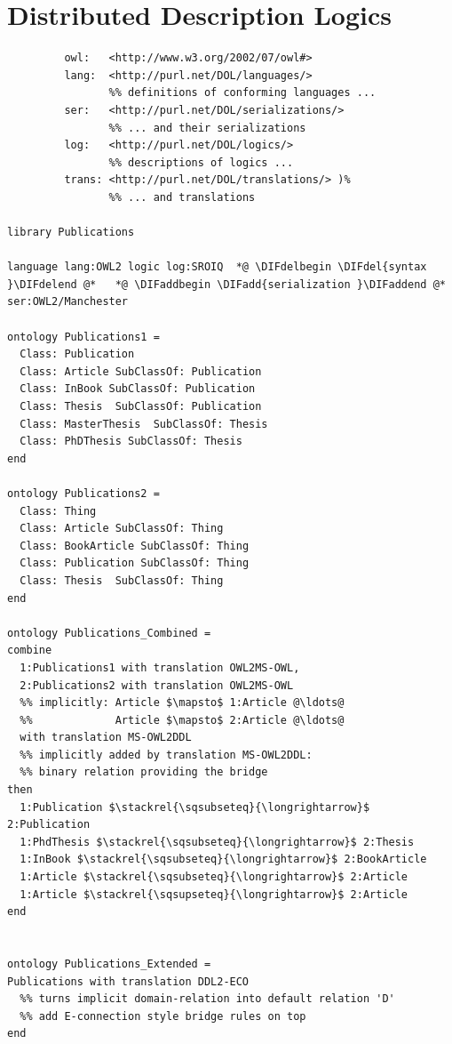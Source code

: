 \documentclass[10pt,fleqn,final]{scrreprt}
\newcommand{\sclause}[1]{\section{#1}}
\providecommand{\DIFadd}[1]{{\protect\color{blue}\uwave{#1}}} %
\providecommand{\DIFdel}[1]{{\protect\color{red}\sout{#1}}}                      %
\providecommand{\DIFaddbegin}{} %
\providecommand{\DIFaddend}{} %
\providecommand{\DIFdelbegin}{} %
\providecommand{\DIFdelend}{} %
\begin{document}
\sclause{Distributed Description Logics}\DIFaddbegin \label{ex:DDL}
\DIFaddend 

\begin{lstlisting}[basicstyle=\ttfamily,language=dolText,alsolanguage=OWL2manchester,escapechar=@,mathescape]
%prefix( :      <http://www.example.org/mereology#>
         owl:   <http://www.w3.org/2002/07/owl#>
         lang:  <http://purl.net/DOL/languages/>
                %% definitions of conforming languages ...
         ser:   <http://purl.net/DOL/serializations/>
                %% ... and their serializations
         log:   <http://purl.net/DOL/logics/>
                %% descriptions of logics ...
         trans: <http://purl.net/DOL/translations/> )%
                %% ... and translations

library Publications

language lang:OWL2 logic log:SROIQ  *@ \DIFdelbegin \DIFdel{syntax }\DIFdelend @*   *@ \DIFaddbegin \DIFadd{serialization }\DIFaddend @*  ser:OWL2/Manchester

ontology Publications1 =
  Class: Publication
  Class: Article SubClassOf: Publication
  Class: InBook SubClassOf: Publication
  Class: Thesis  SubClassOf: Publication
  Class: MasterThesis  SubClassOf: Thesis
  Class: PhDThesis SubClassOf: Thesis
end

ontology Publications2 =
  Class: Thing
  Class: Article SubClassOf: Thing
  Class: BookArticle SubClassOf: Thing
  Class: Publication SubClassOf: Thing
  Class: Thesis  SubClassOf: Thing
end

ontology Publications_Combined =
combine
  1:Publications1 with translation OWL2MS-OWL,
  2:Publications2 with translation OWL2MS-OWL
  %% implicitly: Article $\mapsto$ 1:Article @\ldots@
  %%             Article $\mapsto$ 2:Article @\ldots@  
  with translation MS-OWL2DDL
  %% implicitly added by translation MS-OWL2DDL: 
  %% binary relation providing the bridge
then
  1:Publication $\stackrel{\sqsubseteq}{\longrightarrow}$ 2:Publication
  1:PhdThesis $\stackrel{\sqsubseteq}{\longrightarrow}$ 2:Thesis
  1:InBook $\stackrel{\sqsubseteq}{\longrightarrow}$ 2:BookArticle
  1:Article $\stackrel{\sqsubseteq}{\longrightarrow}$ 2:Article
  1:Article $\stackrel{\sqsupseteq}{\longrightarrow}$ 2:Article
end


ontology Publications_Extended =
Publications with translation DDL2-ECO
  %% turns implicit domain-relation into default relation 'D'
  %% add E-connection style bridge rules on top
end


\end{lstlisting}
\end{document}
